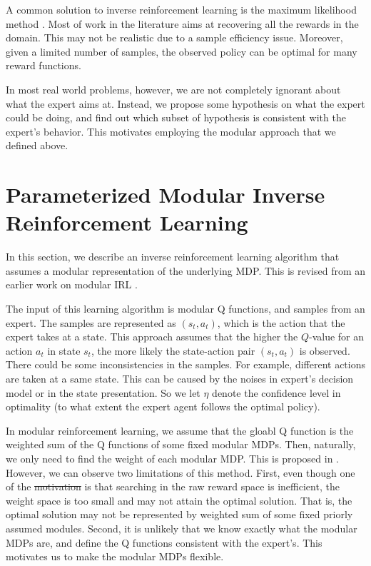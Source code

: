 \documentclass[12pt]{report}	%
\theoremstyle{definition}
\theoremstyle{remark}
\providecommand{\DIFadd}[1]{{\protect\color{blue}\uwave{#1}}} %
\providecommand{\DIFdel}[1]{{\protect\color{red}\sout{#1}}}                      %
\providecommand{\DIFaddbegin}{} %
\providecommand{\DIFaddend}{} %
\providecommand{\DIFdelbegin}{} %
\providecommand{\DIFdelend}{} %
\begin{document}
A common solution to inverse reinforcement learning is the maximum likelihood
method \cite{abbeel2004apprenticeship}. Most of work in the literature aims at recovering all the rewards in the
domain. This may not be realistic due to a sample efficiency issue. Moreover,
given a limited number of samples, the observed policy can be optimal for many
reward functions. 

In most real world problems, however, we are not completely ignorant
about what the expert aims at. Instead, we propose some hypothesis on what the
expert could be doing, and find out which subset of hypothesis is consistent
with the expert's behavior. This motivates employing the modular approach that
we defined above.

\section{Parameterized Modular Inverse Reinforcement Learning}

In this section, we describe an inverse reinforcement learning algorithm that
assumes a modular representation of the underlying MDP. This is revised from an
earlier work on modular IRL \cite{rothkopf2013modular}.

The input of this learning algorithm is modular Q functions, and samples
from an expert. The samples are represented as $(s_t, a_t)$, which is the
action that the expert takes at a state.
This approach assumes that the higher the $Q$-value
for an action $a_t$ in state $s_t$, the more likely the state-action pair
$(s_t,a_t)$ is observed. There could be some inconsistencies in the samples. For
example, different actions are taken at a same state. This can be caused by the
noises in expert's decision model or in the state presentation. So we let $\eta$
denote the confidence level in optimality (to what extent the expert agent follows
the optimal policy). \DIFaddbegin \DIFadd{$\eta$ is set to be $1$ in this thesis.
}\DIFaddend 

In modular reinforcement learning, we assume that the gloabl Q function is the
weighted sum of the Q functions of some fixed modular MDPs. Then, naturally, we only
need to find the weight of each modular MDP. This is proposed in \cite{rothkopf2013modular}.
However, we can observe two
limitations of this method. First, even though one of the \DIFdelbegin \DIFdel{motivation }\DIFdelend \DIFaddbegin \DIFadd{motivations }\DIFaddend is that
searching in the raw reward space is inefficient, the weight space is too small and
may not attain the optimal solution. That is, the optimal solution may not be
represented by weighted sum of some fixed priorly assumed modules.
Second, it is unlikely that we know exactly what the modular MDPs are,
and define the Q functions consistent with the expert's. This motivates us
to make the modular MDPs flexible.
\end{document}
